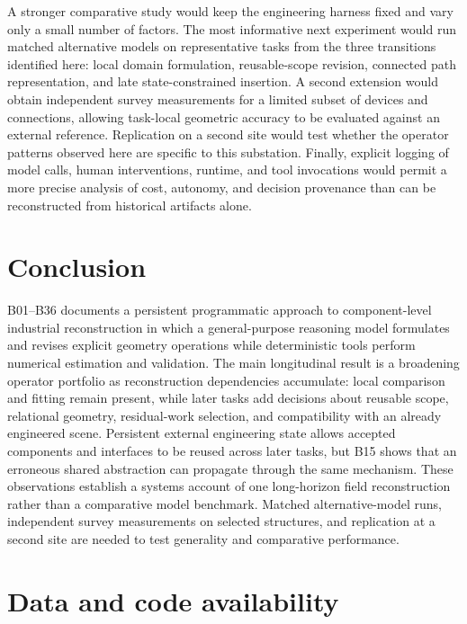 \documentclass[10pt,a4paper]{article}
\begin{document}
A stronger comparative study would keep the engineering harness fixed
and vary only a small number of factors. The most informative next
experiment would run matched alternative models on representative tasks
from the three transitions identified here: local domain formulation,
reusable-scope revision, connected path representation, and late
state-constrained insertion. A second extension would obtain independent
survey measurements for a limited subset of devices and connections,
allowing task-local geometric accuracy to be evaluated against an
external reference. Replication on a second site would test whether the
operator patterns observed here are specific to this substation.
Finally, explicit logging of model calls, human interventions, runtime,
and tool invocations would permit a more precise analysis of cost,
autonomy, and decision provenance than can be reconstructed from
historical artifacts alone.

\hypertarget{conclusion}{%
\section{Conclusion}\label{conclusion}}

B01--B36 documents a persistent programmatic approach to component-level
industrial reconstruction in which a general-purpose reasoning model
formulates and revises explicit geometry operations while deterministic
tools perform numerical estimation and validation. The main longitudinal
result is a broadening operator portfolio as reconstruction dependencies
accumulate: local comparison and fitting remain present, while later
tasks add decisions about reusable scope, relational geometry,
residual-work selection, and compatibility with an already engineered
scene. Persistent external engineering state allows accepted components
and interfaces to be reused across later tasks, but B15 shows that an
erroneous shared abstraction can propagate through the same mechanism.
These observations establish a systems account of one long-horizon field
reconstruction rather than a comparative model benchmark. Matched
alternative-model runs, independent survey measurements on selected
structures, and replication at a second site are needed to test
generality and comparative performance.

\hypertarget{data-and-code-availability}{%
\section{Data and code availability}\label{data-and-code-availability}}
\end{document}
